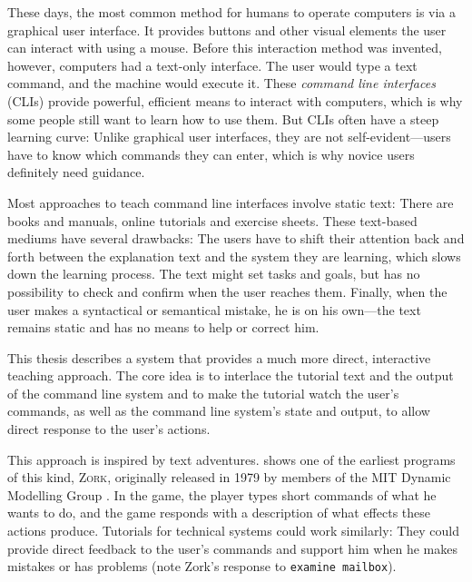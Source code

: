 \documentclass[paper=a4,twoside,abstract=on,cleardoublepage=empty,numbers=noenddot,toc=bib,12pt,appendixprefix=true]{scrreprt}
\begin{document}
These days, the most common method for humans to operate computers is via a graphical user interface. It provides buttons and other visual elements the user can interact with using a mouse. Before this interaction method was invented, however, computers had a text-only interface. The user would type a text command, and the machine would execute it. These \emph{command line interfaces} (CLIs) provide powerful, efficient means to interact with computers, which is why some people still want to learn how to use them. But CLIs often have a steep learning curve: Unlike graphical user interfaces, they are not self-evident---users have to know which commands they can enter, which is why novice users definitely need guidance.

Most approaches to teach command line interfaces involve static text: There are books and manuals, online tutorials and exercise sheets. These text-based mediums have several drawbacks: The users have to shift their attention back and forth between the explanation text and the system they are learning, which slows down the learning process. The text might set tasks and goals, but has no possibility to check and confirm when the user reaches them. Finally, when the user makes a syntactical or semantical mistake, he is on his own---the text remains static and has no means to help or correct him.

This thesis describes a system that provides a much more direct, interactive teaching approach. The core idea is to interlace the tutorial text and the output of the command line system and to make the tutorial watch the user's commands, as well as the command line system's state and output, to allow direct response to the user's actions.

This approach is inspired by text adventures.  shows one of the earliest programs of this kind, \textsc{Zork}, originally released in 1979 by members of the MIT Dynamic Modelling Group \cite{infocom}. In the game, the player types short commands of what he wants to do, and the game responds with a description of what effects these actions produce. Tutorials for technical systems could work similarly: They could provide direct feedback to the user's commands and support him when he makes mistakes or has problems (note Zork's response to \texttt{examine mailbox}).
\end{document}
